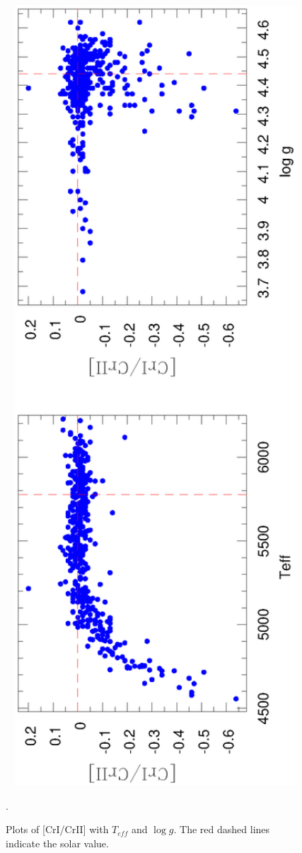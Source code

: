 \documentclass[dvips,12pt,a4paper]{report}
\begin{document}
{{\begin{figure}[h!]
\centering
\includegraphics[angle=-90, trim=10mm 10mm 100mm 10mm, clip, width=12cm]{pics/parte3/CrICrII.eps}
\caption[Plots of CrI/CrII]{Plots of [CrI/CrII] with $T_{eff}$ and $\log g$. The red dashed lines indicate the solar value.}.
\label{cr2cr1}
\end{figure}

}}
\end{document}
